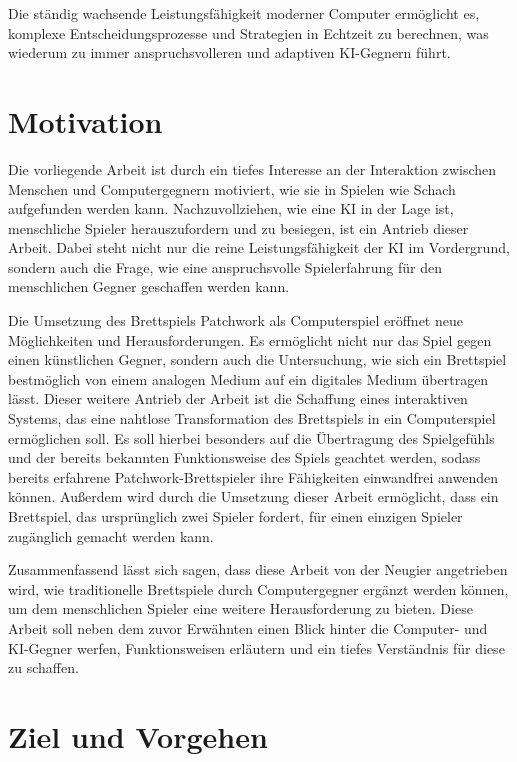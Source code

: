 \vspace*{-5cm}
\pagebreak

Die ständig wachsende Leistungsfähigkeit moderner Computer ermöglicht es, komplexe Entscheidungsprozesse und Strategien in Echtzeit zu berechnen, was wiederum zu immer anspruchsvolleren und adaptiven \ac{KI}-Gegnern führt.

\section{Motivation}
\label{chapter:motivation}

Die vorliegende Arbeit ist durch ein tiefes Interesse an der Interaktion zwischen Menschen und Computergegnern motiviert, wie sie in Spielen wie Schach aufgefunden werden kann. Nachzuvollziehen, wie eine \ac{KI} in der Lage ist, menschliche Spieler herauszufordern und zu besiegen, ist ein Antrieb dieser Arbeit. Dabei steht nicht nur die reine Leistungsfähigkeit der \ac{KI} im Vordergrund, sondern auch die Frage, wie eine anspruchsvolle Spielerfahrung für den menschlichen Gegner geschaffen werden kann.

Die Umsetzung des Brettspiels Patchwork als Computerspiel eröffnet neue Möglichkeiten und Herausforderungen. Es ermöglicht nicht nur das Spiel gegen einen künstlichen Gegner, sondern auch die Untersuchung, wie sich ein Brettspiel bestmöglich von einem analogen Medium auf ein digitales Medium übertragen lässt. Dieser weitere Antrieb der Arbeit ist die Schaffung eines interaktiven Systems, das eine nahtlose Transformation des Brettspiels in ein Computerspiel ermöglichen soll. Es soll hierbei besonders auf die Übertragung des Spielgefühls und der bereits bekannten Funktionsweise des Spiels geachtet werden, sodass bereits erfahrene Patchwork-Brettspieler ihre Fähigkeiten einwandfrei anwenden können. Außerdem wird durch die Umsetzung dieser Arbeit ermöglicht, dass ein Brettspiel, das ursprünglich zwei Spieler fordert, für einen einzigen Spieler zugänglich gemacht werden kann.

Zusammenfassend lässt sich sagen, dass diese Arbeit von der Neugier angetrieben wird, wie traditionelle Brettspiele durch Computergegner ergänzt werden können, um dem menschlichen Spieler eine weitere Herausforderung zu bieten. Diese Arbeit soll neben dem zuvor Erwähnten einen Blick hinter die Computer- und \ac{KI}-Gegner werfen, Funktionsweisen erläutern und ein tiefes Verständnis für diese zu schaffen.

\pagebreak

\section{Ziel und Vorgehen}
\label{chapter:ziel-und-vorgehen}

